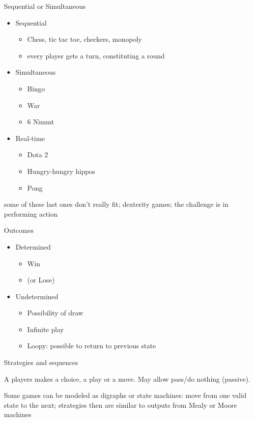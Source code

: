 \documentclass[compress]{beamer}
\newcommand{\blue}[1]{\textcolor{NordBlue}{#1}}
\newcommand{\red}[1]{\textcolor{NordRed}{#1}}
\newcommand{\yellow}[1]{\textcolor{NordYellow}{#1}}
\newcommand{\magenta}[1]{\textcolor{NordMagenta}{#1}}
\newcommand{\cyan}[1]{\textcolor{NordCyan}{#1}}
\newcommand{\bcyan}[1]{\textcolor{NordBrightCyan}{#1}}
\begin{document}
\begin{frame}{Sequential or Simultaneous}
\begin{itemize}
\item \yellow{Sequential}
\begin{itemize}
    \item Chess, tic tac toe, checkers, monopoly
    \item every player gets a turn, constituting a round
\end{itemize}

\item \red{Simultaneous}
\begin{itemize}
    \item Bingo
    \item War
    \item 6 Nimmt
\end{itemize}

\item \blue{Real-time}
\begin{itemize}
    \item Dota 2
    \item Hungry-hungry hippos
    \item Pong
\end{itemize}
\end{itemize}
\bigskip
{\tiny some of these last ones don't really fit; dexterity games; the challenge is in performing action}
\end{frame}

\begin{frame}{Outcomes}

\begin{itemize}
    \item \magenta{Determined}
    \begin{itemize}
        \item Win
        \item (or Lose)
    \end{itemize}
    \item \magenta{Undetermined}
    \begin{itemize}
        \item Possibility of draw
        \item Infinite play
        \item Loopy: possible to return to previous state
    \end{itemize}
\end{itemize}
\end{frame}
\begin{frame}{Strategies and sequences}

A \bcyan{players} makes a choice, a \magenta{play} or a \red{move}. May allow pass/do nothing (passive).

\medskip
Some games can be modeled as \cyan{digraphs} or \blue{state machines}: move from one valid state to the next;
strategies then are similar to outputs from Mealy or Moore machines

\medskip

\end{frame}
\end{document}
